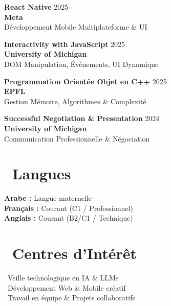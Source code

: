 \documentclass[a4paper,9pt]{extarticle}
\def\faLanguage{}%
\def\faHeart{}%
\begin{document}
\begin{minipage}[t]{0.405\textwidth}
  \vspace{2.5pt}
  \textbf{\color{primary}\small React Native} \hfill {\scriptsize\color{textmuted} 2025}\\
  {\footnotesize \textbf{Meta}}\\
  {\scriptsize\color{textdark} Développement Mobile Multiplateforme \& UI}

  \vspace{2.5pt}
  \textbf{\color{primary}\small Interactivity with JavaScript} \hfill {\scriptsize\color{textmuted} 2025}\\
  {\footnotesize \textbf{University of Michigan}}\\
  {\scriptsize\color{textdark} DOM Manipulation, Événements, UI Dynamique}

  \vspace{2.5pt}
  \textbf{\color{primary}\small Programmation Orientée Objet en C++} \hfill {\scriptsize\color{textmuted} 2025}\\
  {\footnotesize \textbf{EPFL}}\\
  {\scriptsize\color{textdark} Gestion Mémoire, Algorithmes \& Complexité}

  \vspace{2.5pt}
  \textbf{\color{primary}\small Successful Negotiation \& Presentation} \hfill {\scriptsize\color{textmuted} 2024}\\
  {\footnotesize \textbf{University of Michigan}}\\
  {\scriptsize\color{textdark} Communication Professionnelle \& Négociation}

  \vspace{3pt}

  \section{\faLanguage\ Langues}
  {\footnotesize
    \textbf{Arabe :} Langue maternelle\\[1pt]
    \textbf{Français :} Courant (C1 / Professionnel)\\[1pt]
    \textbf{Anglais :} Courant (B2/C1 / Technique)
  }

  \vspace{3pt}

  \section{\faHeart\ Centres d'Intérêt}
  {\footnotesize
    \faRobot\ Veille technologique en IA \& LLMs\\[1pt]
    \faCode\ Développement Web \& Mobile créatif\\[1pt]
    \faUsers\ Travail en équipe \& Projets collaboratifs
  }

\end{minipage}
\end{document}
